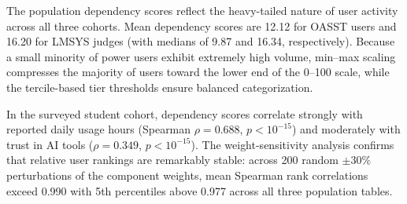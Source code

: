 The population dependency scores reflect the heavy-tailed nature of user activity across all three cohorts. Mean dependency scores are 12.12 for OASST users and 16.20 for LMSYS judges (with medians of 9.87 and 16.34, respectively). Because a small minority of power users exhibit extremely high volume, min--max scaling compresses the majority of users toward the lower end of the 0--100 scale, while the tercile-based tier thresholds ensure balanced categorization.

In the surveyed student cohort, dependency scores correlate strongly with reported daily usage hours (Spearman $\rho = 0.688$, $p < 10^{-15}$) and moderately with trust in AI tools ($\rho = 0.349$, $p < 10^{-15}$). The weight-sensitivity analysis confirms that relative user rankings are remarkably stable: across 200 random $\pm 30\%$ perturbations of the component weights, mean Spearman rank correlations exceed 0.990 with 5th percentiles above 0.977 across all three population tables.